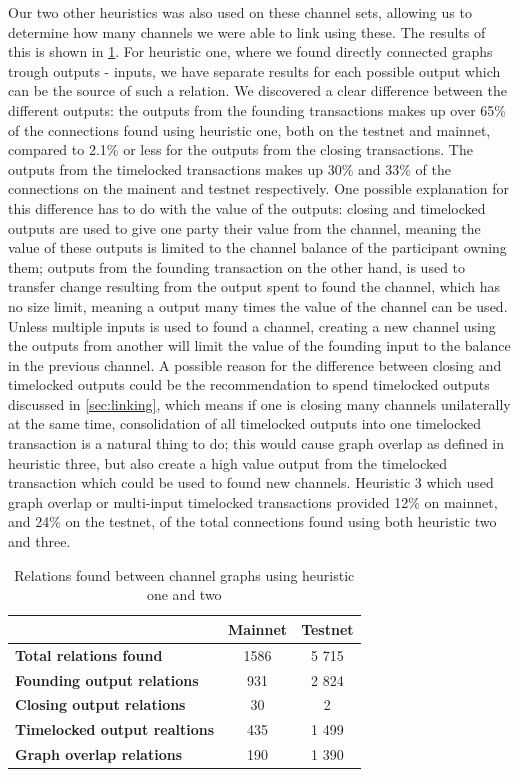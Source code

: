 Our two other heuristics was also used on these channel sets, allowing us to determine how many channels we were able to link using these. The results of this is shown in \cref{table:connections}. For heuristic one, where we found directly connected graphs trough outputs - inputs, we have separate results for each possible output which can be the source of such a relation. We discovered a clear difference between the different outputs: the outputs from the founding transactions makes up over 65\% of the connections found using heuristic one, both on the testnet and mainnet, compared to 2.1\% or less for the outputs from the closing transactions. The outputs from the timelocked transactions makes up 30\% and 33\% of the connections on the mainent and testnet respectively. One possible explanation for this difference has to do with the value of the outputs: closing and timelocked outputs are used to give one party their value from the channel, meaning the value of these outputs is limited to the channel balance of the participant owning them; outputs from the founding transaction on the other hand, is used to transfer change resulting from the output spent to found the channel, which has no size limit, meaning a output many times the value of the channel can be used. Unless multiple inputs is used to found a channel, creating a new channel using the outputs from another will limit the value of the founding input to the balance in the previous channel. A possible reason for the difference between closing and timelocked outputs could be the recommendation to spend timelocked outputs discussed in \cref{sec:linking}, which means if one is closing many channels unilaterally at the same time, consolidation of all timelocked outputs into one timelocked transaction is a natural thing to do; this would cause graph overlap as defined in heuristic three, but also create a high value output from the timelocked transaction which could be used to found new channels. Heuristic 3 which used graph overlap or multi-input timelocked transactions provided 12\% on mainnet, and 24\% on the testnet, of the total connections found using both heuristic two and three.

\begin{table}[ht]
\centering
\caption{Relations found between channel graphs using heuristic one and two}
\label{table:connections}
\begin{tabular}{l|c|c}
                                        & \textbf{Mainnet} & \textbf{Testnet} \\ \hline
\textbf{Total relations found}       & 1586              & 5 715             \\ \hline
\textbf{Founding output relations}   & 931               & 2 824             \\ \hline
\textbf{Closing output relations}    & 30                & 2                \\ \hline
\textbf{Timelocked output realtions} & 435               & 1 499             \\ \hline
\textbf{Graph overlap relations}     & 190               & 1 390             \\ \hline
\end{tabular}
\end{table}

